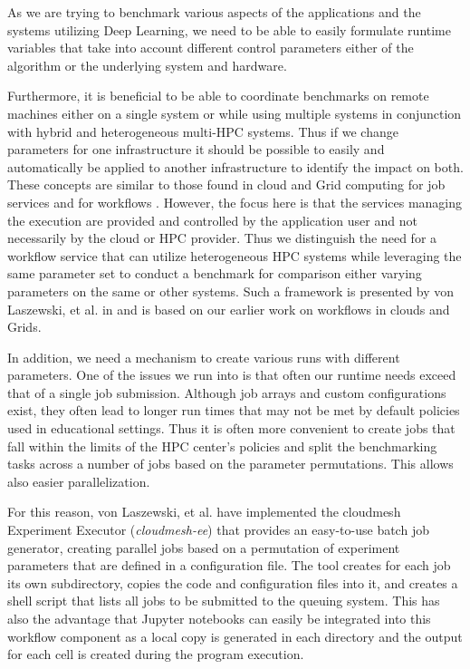As we are trying to benchmark various aspects of the applications and the systems utilizing Deep Learning, we need to be able to easily formulate runtime variables that take into account different control parameters either of the algorithm or the underlying system and hardware.

Furthermore, it is beneficial to be able to coordinate benchmarks on remote machines either on a single system or while using multiple systems in conjunction with hybrid and heterogeneous multi-HPC systems. 
Thus if we change parameters for one infrastructure it should be possible to easily and automatically be applied to another infrastructure to identify the impact on both.
These concepts are similar to those found in cloud and Grid computing for job services \citep{las-infogram} and for workflows \citep{las-workflow,las07-workflow}. However, the focus here is that the services managing the execution are provided and controlled by the application user and not necessarily by the cloud or HPC provider. Thus we distinguish the need for a workflow service that can utilize heterogeneous HPC systems while leveraging the same parameter set to conduct a benchmark for comparison either varying parameters on the same or other systems. Such a framework is presented by von Laszewski, et al. in \citep{las-22-arxiv-workflow-cc,las-2023-escience} and is based on our earlier work on workflows in clouds and Grids.

In addition, we need a mechanism to create various runs with different parameters. One of the issues we run into is that often our runtime needs exceed that of a single job submission. Although job arrays and custom configurations exist, they often lead to longer run times that may not be met by default policies used in educational settings. Thus it is often more convenient to create jobs that fall within the limits of the HPC center's policies and split the benchmarking tasks across a number of jobs based on the parameter permutations. This allows also easier parallelization.

For this reason, von Laszewski, et al. have implemented the cloudmesh Experiment Executor ({\it cloudmesh-ee}) that provides an easy-to-use batch job generator, creating parallel jobs based on a permutation of experiment parameters that are defined in a configuration file. The tool creates for each job its own subdirectory, copies the code and configuration files into it, and creates a shell script that lists all jobs to be submitted to the queuing system. This has also the advantage that Jupyter notebooks can easily be integrated into this workflow component as a local copy is generated in each directory and the output for each cell is created during the program execution.

